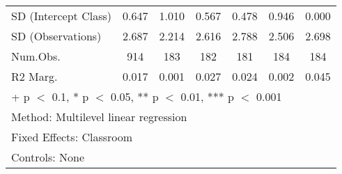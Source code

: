 \documentclass[
  letterpaper,
  DIV=11,
  numbers=noendperiod]{scrreprt}
\begin{document}
\begin{table}
\begin{tabular}[t]{lcccccc}
\hspace{1em}SD (Intercept Class) & 0.647 & 1.010 & 0.567 & 0.478 & 0.946 & 0.000\\
\hspace{1em}SD (Observations) & 2.687 & 2.214 & 2.616 & 2.788 & 2.506 & 2.698\\
\hspace{1em}Num.Obs. & 914 & 183 & 182 & 181 & 184 & 184\\
\hspace{1em}R2 Marg. & 0.017 & 0.001 & 0.027 & 0.024 & 0.002 & 0.045\\
\bottomrule
\multicolumn{7}{l}{\rule{0pt}{1em}+ p $<$ 0.1, * p $<$ 0.05, ** p $<$ 0.01, *** p $<$ 0.001}\\
\multicolumn{7}{l}{\rule{0pt}{1em}Method: Multilevel linear regression}\\
\multicolumn{7}{l}{\rule{0pt}{1em}Fixed Effects: Classroom}\\
\multicolumn{7}{l}{\rule{0pt}{1em}Controls: None}\\
\end{tabular}
\end{table}
\end{document}

